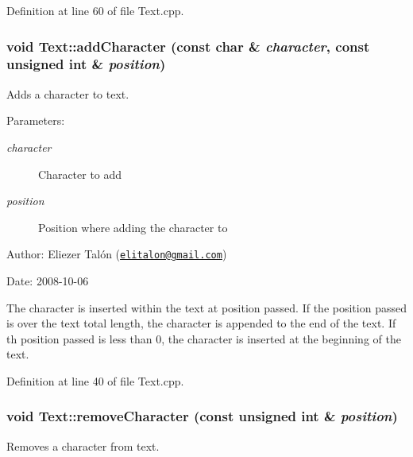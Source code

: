 Definition at line 60 of file Text.cpp.\hypertarget{class_text_fdd11ad0c90ca483d4cff3d74a64da9e}{
\subsubsection[addCharacter]{\setlength{\rightskip}{0pt plus 5cm}void Text::addCharacter (const char \& {\em character}, \/  const unsigned int \& {\em position})}}
\label{class_text_fdd11ad0c90ca483d4cff3d74a64da9e}


Adds a character to text. 

\begin{Desc}
\item[Parameters:]
\begin{description}
\item[{\em character}]Character to add \item[{\em position}]Position where adding the character to\end{description}
\end{Desc}
\begin{Desc}
\item[Author:]Eliezer Talón (\href{mailto:elitalon@gmail.com}{\tt elitalon@gmail.com}) \end{Desc}
\begin{Desc}
\item[Date:]2008-10-06\end{Desc}
The character is inserted within the text at position passed. If the position passed is over the text total length, the character is appended to the end of the text. If th position passed is less than 0, the character is inserted at the beginning of the text. 

Definition at line 40 of file Text.cpp.\hypertarget{class_text_e04500eeada2a4a3bb00554b32263c52}{
\subsubsection[removeCharacter]{\setlength{\rightskip}{0pt plus 5cm}void Text::removeCharacter (const unsigned int \& {\em position})}}
\label{class_text_e04500eeada2a4a3bb00554b32263c52}


Removes a character from text. 

